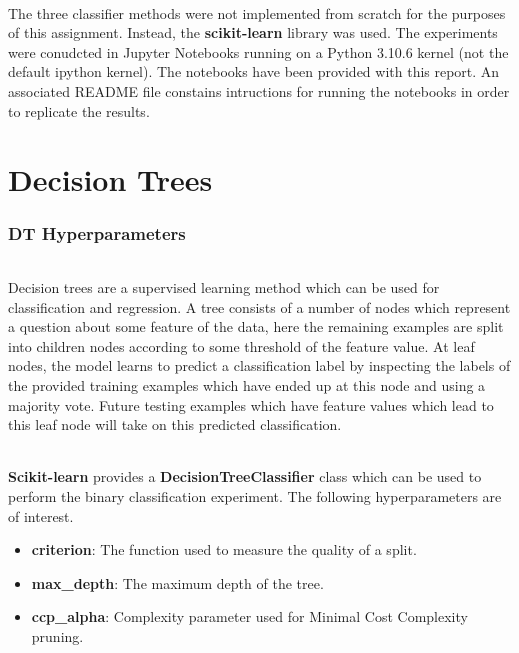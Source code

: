 \documentclass[12pt, letterpaper]{article}
\begin{document}
\paragraph*{}The three classifier methods were not implemented from scratch for
the purposes of this assignment. Instead, the \textbf{scikit-learn} library was
used. The experiments were conudcted in Jupyter Notebooks running on a Python
3.10.6 kernel (not the default ipython kernel). The notebooks have been provided
with this report. An associated README file constains intructions for running
the notebooks in order to replicate the results.

\part*{Decision Trees}

\section{DT Hyperparameters}

\paragraph*{}Decision trees are a supervised learning method which can be used
for classification and regression. A tree consists of a number of nodes which
represent a question about some feature of the data, here the remaining examples
are split into children nodes according to some threshold of the feature value.
At leaf nodes, the model learns to predict a classification label by inspecting
the labels of the provided training examples which have ended up at this node
and using a majority vote. Future testing examples which have feature values
which lead to this leaf node will take on this predicted classification.

\paragraph*{}\textbf{Scikit-learn} provides a \textbf{DecisionTreeClassifier}
class which can be used to perform the binary classification experiment. The
following hyperparameters are of interest.

\begin{itemize}
    \item \textbf{criterion}: The function used to measure the quality of a
    split.
    \item \textbf{max\_depth}: The maximum depth of the tree.
    \item \textbf{ccp\_alpha}: Complexity parameter used for Minimal Cost Complexity
    pruning.
\end{itemize}
\end{document}
